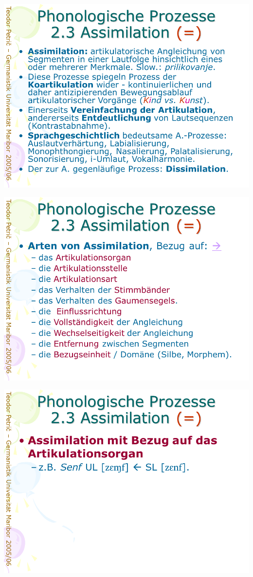 \documentclass[
  letterpaper,
]{scrbook}
\begin{document}
\includegraphics[width=1\textwidth,height=\textheight]{./pictures/prozesse/prozesse_24.PNG}

\includegraphics[width=1\textwidth,height=\textheight]{./pictures/prozesse/prozesse_25.PNG}

\includegraphics[width=1\textwidth,height=\textheight]{./pictures/prozesse/prozesse_26.PNG}
\end{document}
